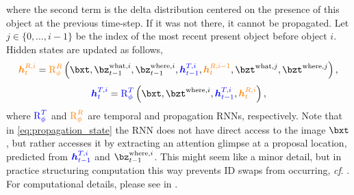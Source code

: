 where the second term is the delta distribution centered on the presence of this object at the previous time-step.
If it was not there, it cannot be propagated.
Let $j \in \{0, \dots, i-1\}$ be the index of the most recent present object before object $i$. Hidden states are updated as follows,
\begin{equation} \label{eq:propagation_state}
        \hR{t}{i} = \Rr \left(
        \bxt,
        \bz_{t-1}^{\mathrm{what}, i}, \bz_{t-1}^{\mathrm{where}, i}, 
        \hT{t-1}{i}, \hR{t}{i-1},
        \bzt^{\mathrm{what}, j}, \bzt^{\mathrm{where}, j}
    \right),
\end{equation}
\begin{equation} \label{eq:temporal_state}
    \hT{t}{i} = \RT \left(
        \bxt,
        \bzt^{\mathrm{where}, i}, 
        \hT{t-1}{i}, \hR{t}{i}
    \right),
\end{equation}
where $\textcolor{blue}{\operatorname{R}_\phi^T}$ and $\textcolor{orange}{\operatorname{R}_\phi^R}$ are temporal and propagation \glspl{RNN}, respectively.
Note that in \cref{eq:propagation_state} the \gls{RNN} does not have direct access to the image $\bxt$, but rather accesses it by extracting an attention glimpse at a proposal location, predicted from $\textcolor{blue}{\bm{h}_{t-1}^{T, i}}$ and $\bz_{t-1}^{\mathrm{where}, i}$.
This might seem like a minor detail, but in practice structuring computation this way prevents ID swaps from occurring, \textit{cf}. .
For computational details, please see  in .